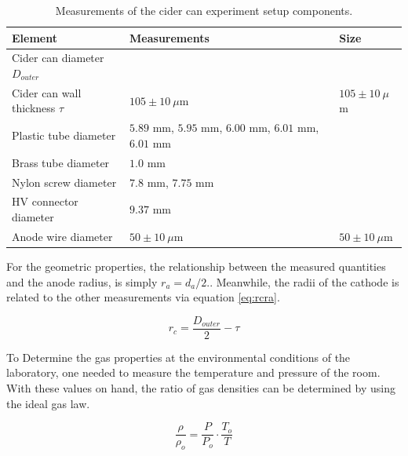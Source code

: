 \begin{table}[htb]
  \begin{tabularx}{\linewidth}{X|X|p{2cm}}
    \textbf{Element}                   & \textbf{Measurements}                                 & \textbf{Size}       \\ \hline
    Cider can diameter $D_{outer}$      &                                                       &                     \\
    Cider can wall thickness   $\tau$ & $105 \pm 10 \ \mu$m                                   & $105 \pm 10 \ \mu$m \\
    Plastic tube diameter             & $5.89$ mm, $5.95$ mm, $6.00$ mm, $6.01$ mm, $6.01$ mm &                     \\
    Brass tube diameter               & $1.0$ mm                                              &                     \\
    Nylon screw diameter              & $7.8$ mm, $7.75$ mm                                   &                     \\
    HV connector diameter             & $9.37$ mm                                             &                     \\
    Anode wire diameter               & $50 \pm 10 \ \mu$m                                    & $50 \pm 10 \ \mu$m 
  \end{tabularx}
  \caption{Measurements of the cider can experiment setup components.}
  \label{Tab:cidercan_sizes}
\end{table}

For the geometric properties, the relationship between the measured quantities and the anode radius, is simply $r_{a} = d_{a}/2.$. Meanwhile, the radii of the cathode is related to the other measurements via equation \ref{eq:rcra}.

\begin{equation}
  \label{eq:rcra}
  r_{c} = \frac{D_{outer}}{2}-\tau
\end{equation}

To Determine the gas properties at the environmental conditions of the laboratory, one needed to measure the temperature and pressure of the room. With these values on hand, the ratio of gas densities can be determined by using the ideal gas law.

\begin{equation}
  \label{eq:gaslaw}
  \frac{\rho}{\rho_{o}} = \frac{P}{P_{o}}\cdot \frac{T_{o}}{T}
\end{equation}

